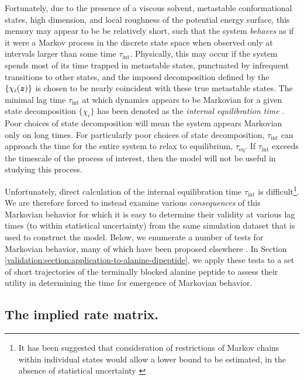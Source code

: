 Fortunately, due to the presence of a viscous solvent, metastable conformational states, high dimension, and local roughness of the potential energy surface, this memory may appear to be be relatively short, such that the system \emph{behaves} as if it were a Markov process in the discrete state space when observed only at intervals larger than some time $\tau_{\mathrm{int}}$.
Physically, this may occur if the system spends most of its time trapped in metastable states, punctuated by infrequent transitions to other states, and the imposed decomposition defined by the $\{\chi_i({\mbox{\boldmath{$z$}}})\}$ is chosen to be nearly coincident with these true metastable states.
The minimal lag time $\tau_{\mathrm{int}}$ at which dynamics appears to be Markovian for a given state decomposition $\{\chi_i\}$ has been denoted as the \emph{internal equilibration time} \cite{chodera:jcp:2006}.
Poor choices of state decomposition will mean the system appears Markovian only on long times.
For particularly poor choices of state decomposition, $\tau_{\mathrm{int}}$ can approach the time for the entire system to relax to equilibrium, $\tau_\mathrm{eq}$.
If $\tau_\mathrm{int}$ exceeds the timescale of the process of interest, then the model will not be useful in studying this process.

Unfortunately, direct calculation of the internal equilibration time $\tau_{\mathrm{int}}$ is difficult\footnote{It has been suggested that consideration of restrictions of Markov chains within individual states would allow a lower bound to be estimated, in the absence of statistical uncertainty \cite{fischer-thesis,meerbach:2004a}}.
We are therefore forced to instead examine various \emph{consequences} of this Markovian behavior for which it is easy to determine their validity at various lag times (to within statistical uncertainty) from the same simulation dataset that is used to construct the model.
Below, we enumerate a number of tests for Markovian behavior, many of which have been proposed elsewhere \cite{swope:2004a}.
In Section \ref{validation:section:application-to-alanine-dipeptide}, we apply these tests to a set of short trajectories of the terminally blocked alanine peptide to assess their utility in determining the time for emergence of Markovian behavior.

\subsection{The implied rate matrix.}
\label{validation:section:implied-rate-matrix-test}

